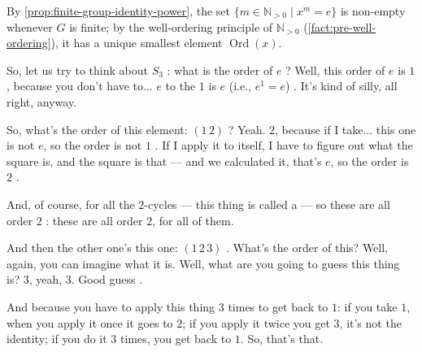 \begin{content}

\begin{steps}
By \cref{prop:finite-group-identity-power}, the set $\{ m \in \mathbb{N}_{>0} \mid x^m = e \}$ is non-empty whenever $G$ is finite; by the well-ordering principle of $\mathbb{N}_{>0}$ (\cref{fact:pre-well-ordering}), it has a unique smallest element $\operatorname{Ord}(x)$.
\end{steps}
\end{content}

\begin{speech}[01:23:02 - 01:24:34]
So, let us try to think about $S_3$ : what is the order of $e$ ? Well, this order of $e$ is $1$, because you don't have to... $e$ to the $1$ is $e$ (i.e., $e^1 = e$) . It's kind of silly, all right, anyway.

So, what's the order of this element: $(1\,2)$ ?  Yeah. $2$, because if I take... this one is not $e$, so the order is not $1$ . If I apply it to itself, I have to figure out what the square is, and the square is that --- and we calculated it, that's $e$, so the order is $2$ .

And, of course, for all the $2$-cycles --- this thing is called a  --- so these are all order $2$ : these are all order $2$, for all of them.

And then the other one's this one: $(1\,2\,3)$ . What's the order of this? Well, again, you can imagine what it is. Well, what are you going to guess this thing is?  $3$, yeah, $3$. Good guess .

And because you have to apply this thing $3$ times to get back to $1$: if you take $1$, when you apply it once it goes to $2$; if you apply it twice you get $3$, it's not the identity; if you do it $3$ times, you get back to $1$. So, that's that.
\end{speech}

